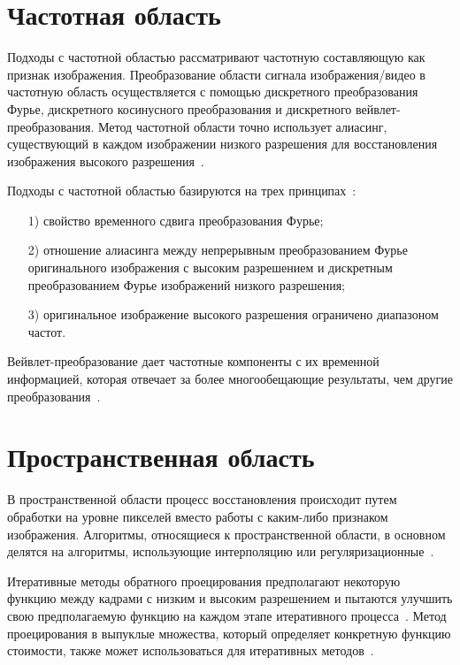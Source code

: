 \documentclass{bmstu}
\begin{document}
\section{Частотная область}

Подходы с частотной областью рассматривают частотную составляющую как признак изображения. 
Преобразование области сигнала изображения/видео в частотную область осуществляется с помощью дискретного преобразования Фурье, дискретного косинусного преобразования и дискретного вейвлет-преобразования. 
Метод частотной области точно использует алиасинг, существующий в каждом изображении низкого разрешения для восстановления изображения высокого разрешения~\cite{Daithankar2021}.

Подходы с частотной областью базируются на трех принципах~\cite{Thapa2016}:
\begin{enumerate}
\item[1)] свойство временного сдвига преобразования Фурье;
\item[2)] отношение алиасинга между непрерывным преобразованием Фурье оригинального изображения с высоким разрешением и дискретным преобразованием Фурье изображений низкого разрешения;
\item[3)] оригинальное изображение высокого разрешения ограничено диапазоном частот.
\end{enumerate}

Вейвлет-преобразование дает частотные компоненты с их временной информацией, которая отвечает за более многообещающие результаты, чем другие преобразования~\cite{Daithankar2021}.

\section{Пространственная область}

В пространственной области процесс восстановления происходит путем обработки на уровне пикселей вместо работы с каким-либо признаком изображения. 
Алгоритмы, относящиеся к пространственной области, в основном делятся на алгоритмы, использующие интерполяцию или регуляризационные~\cite{Daithankar2021}.

Итеративные методы обратного проецирования предполагают некоторую функцию между кадрами с низким и высоким разрешением и пытаются улучшить свою предполагаемую функцию на каждом этапе итеративного процесса~\cite{Cohen2000}. 
Метод проецирования в выпуклые множества, который определяет конкретную функцию стоимости, также может использоваться для итеративных методов~\cite{Katsaggelos1997}.
\end{document}
